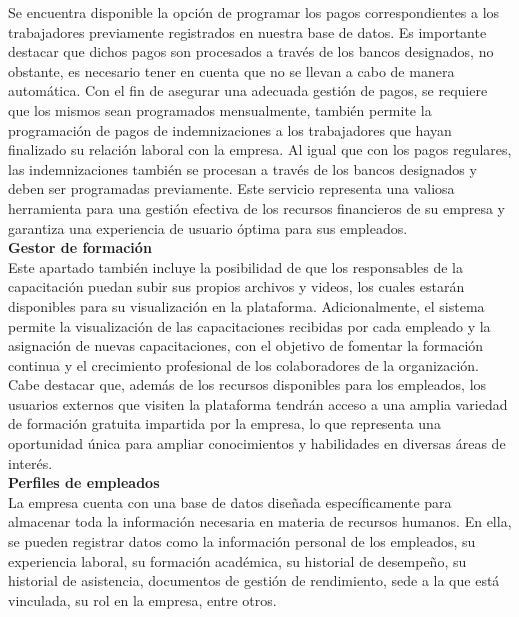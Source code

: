   Se encuentra disponible la opción de programar los pagos correspondientes a los trabajadores previamente registrados en nuestra base de datos. Es importante destacar que dichos pagos son procesados a través de los bancos designados, no obstante, es necesario tener en cuenta que no se llevan a cabo de manera automática. Con el fin de asegurar una adecuada gestión de pagos, se requiere que los mismos sean programados mensualmente, también permite la programación de pagos de indemnizaciones a los trabajadores que hayan finalizado su relación laboral con la empresa. Al igual que con los pagos regulares, las indemnizaciones también se procesan a través de los bancos designados y deben ser programadas previamente. Este servicio representa una valiosa herramienta para una gestión efectiva de los recursos financieros de su empresa y garantiza una experiencia de usuario óptima para sus empleados.
  \\ \newline
  \textbf{Gestor de formación}
  \\ \newline
  Este apartado también incluye la posibilidad de que los responsables de la capacitación puedan subir sus propios archivos y videos, los cuales estarán disponibles para su visualización en la plataforma. Adicionalmente, el sistema permite la visualización de las capacitaciones recibidas por cada empleado y la asignación de nuevas capacitaciones, con el objetivo de fomentar la formación continua y el crecimiento profesional de los colaboradores de la organización. Cabe destacar que, además de los recursos disponibles para los empleados, los usuarios externos que visiten la plataforma tendrán acceso a una amplia variedad de formación gratuita impartida por la empresa, lo que representa una oportunidad única para ampliar conocimientos y habilidades en diversas áreas de interés.
  \\ \newline
  \textbf{Perfiles de empleados}
  \\ \newline
  La empresa cuenta con una base de datos diseñada específicamente para almacenar toda la información necesaria en materia de recursos humanos. En ella, se pueden registrar datos como la información personal de los empleados, su experiencia laboral, su formación académica, su historial de desempeño, su historial de asistencia, documentos de gestión de rendimiento, sede a la que está vinculada, su rol en la empresa, entre otros.
  \\ \newline
